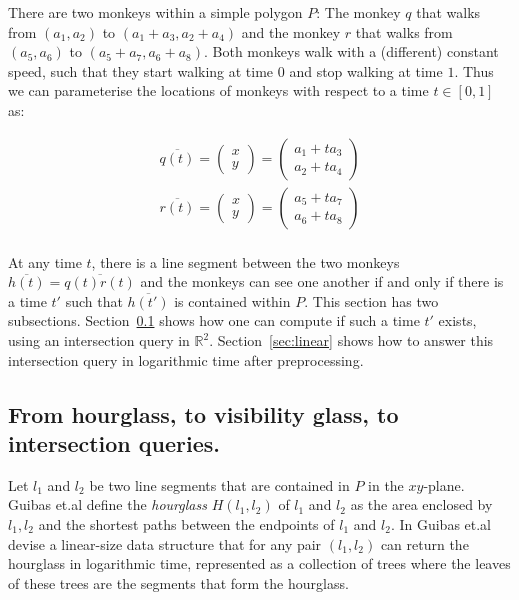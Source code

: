 \documentclass{article}
\newcommand{\etal}{et.al\xspace}
\begin{document}
There are two monkeys within a simple polygon $P$: The monkey $q$ that walks from $(a_1, a_2)$ to $(a_1 + a_3, a_2 + a_4)$ and the monkey $r$ that walks from  $(a_5, a_6)$ to $(a_5 + a_7, a_6 + a_8)$. Both monkeys walk with a (different) constant speed, such that they start  walking at time $0$ and stop walking at time $1$.  Thus we can parameterise the locations of monkeys with respect to a time $t \in [0,1]$ as: 

\begin{align*}
    \overline{q(t)} = \left( \begin{array}{c}
         x  \\
         y 
    \end{array}  \right) = \left( \begin{array}{c}
         a_1 + t a_3  \\
         a_2 + t a_4
    \end{array} \right)  \\
    \overline{r(t)} = \left( \begin{array}{c}
         x  \\
         y 
    \end{array}  \right) = \left( \begin{array}{c}
         a_5 + t a_7  \\
         a_6 + t a_8
    \end{array} \right)  \\
\end{align*}

At any time $t$, there is a line segment between the two monkeys $\overline{h(t)}= \overline{q(t)r(t)}$ and the monkeys can see one another if and only if there is a time $t'$ such that $\overline{h(t')}$ is contained within $P$. This section has two subsections. Section~\ref{sec:nonghost} shows how one can compute if such a time $t'$ exists, using an intersection query in $\mathbb{R}^2$. Section~\ref{sec:linear} shows how to answer this intersection query in logarithmic time after preprocessing.


\subsection{From hourglass, to visibility glass, to intersection queries.}
\label{sec:nonghost}

Let $l_1$ and $l_2$ be two line segments that are contained in $P$ in the $xy$-plane. Guibas \etal define the \emph{hourglass} $H(l_1, l_2)$ of $l_1$ and $l_2$ as the area enclosed by $l_1, l_2$ and the shortest paths between the endpoints of $l_1$ and $l_2$. In \cite{GUIBAS1989126} Guibas \etal devise a linear-size data structure that for any pair $(l_1, l_2)$ can return the hourglass in logarithmic time, represented as a collection of trees where the leaves of these trees are the segments that form the hourglass.
\end{document}
